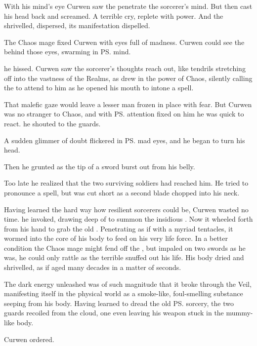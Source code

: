 With his mind's eye Curwen saw the \Qliphah{} penetrate the sorcerer's mind. 
But then \Onatol{} cast his head back and screamed. 
A terrible cry, replete with \chaotic{} power. 
And the \Qliphah{} shrivelled, dispersed, its manifestation dispelled. 

The Chaos mage fixed Curwen with eyes full of madness. 
Curwen could see the \daemons{} behind those eyes, swarming in \ps{\Onatol}{} mind. 

 he hissed. 
Curwen saw the sorcerer's thoughts reach out, like tendrils stretching off into the vastness of the Realms, as \Onatol{} drew in the power of Chaos, silently calling the \daemons{} to attend to him as he opened his mouth to intone a spell. 

That malefic gaze would leave a lesser man frozen in place with fear. 
But Curwen was no stranger to Chaos, and with \ps{\Onatol}{} attention fixed on him he was quick to react. 
 he shouted to the guards. 

A sudden glimmer of doubt flickered in \ps{\Onatol}{} mad eyes, and he began to turn his head. 

Then he grunted as the tip of a sword burst out from his belly. 

Too late he realized that the two surviving soldiers had reached him. He tried to pronounce a spell, but was cut short as a second blade chopped into his neck. 

Having learned the hard way how resilient sorcerers could be, Curwen wasted no time. 
\ta{\Bozchul!} he invoked, drawing deep of \nieur{} to summon the insidious \Qliphah{}. 
Now it wheeled forth from his hand to grab the old \scatha. 
Penetrating \Onatol{} as if with a myriad tentacles, it wormed into the core of his body to feed on his very life force. 
In a better condition the Chaos mage might fend off the \Qliphah, but impaled on two swords as he was, he could only rattle as the terrible \Archon{} snuffed out his life. 
His body dried and shrivelled, as if aged many decades in a matter of seconds. 

The dark energy unleashed was of such magnitude that it broke through the Veil, manifesting itself in the physical world as a smoke-like, foul-smelling substance seeping from his body. 
Having learned to dread the old \ps{\dax} sorcery, the two guards recoiled from the cloud, one even leaving his weapon stuck in the mummy-like body. 

 Curwen ordered. 

